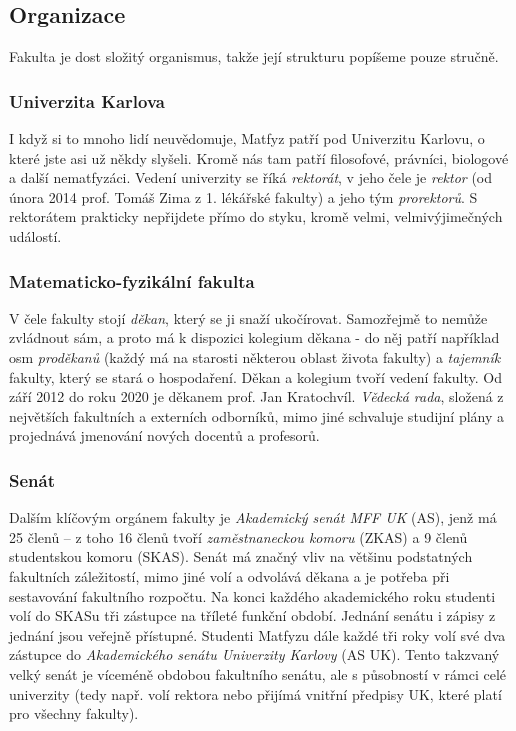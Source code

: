 \subsection{Organizace}
Fakulta je dost složitý organismus, takže její strukturu popíšeme pouze stručně.


\subsubsection{Univerzita Karlova}
I když si to mnoho lidí neuvědomuje, Matfyz patří pod Univerzitu Karlovu, o které
jste asi už někdy slyšeli. Kromě nás tam patří filosofové, právníci, biologové a
další nematfyzáci. Vedení univerzity se říká \textit{rektorát}, v jeho čele je
\textit{rektor} (od února 2014 prof. Tomáš Zima z 1. lékářské fakulty) a jeho
tým \textit{prorektorů}. S rektorátem prakticky nepřijdete přímo do styku, kromě
velmi, velmivýjimečných událostí.


\subsubsection{Matematicko-fyzikální fakulta}
V čele fakulty stojí \textit{děkan}, který se ji snaží ukočírovat. Samozřejmě to
nemůže zvládnout sám, a proto má k dispozici kolegium děkana - do něj patří
například osm \textit{proděkanů} (každý má na starosti některou oblast života
fakulty) a \textit{tajemník} fakulty, který se stará o hospodaření. Děkan a
kolegium tvoří vedení fakulty. Od září 2012 do roku 2020 je děkanem prof. Jan
Kratochvíl. \textit{Vědecká rada}, složená z největších fakultních a externích
odborníků, mimo jiné schvaluje studijní plány a projednává jmenování nových
docentů a profesorů.


\subsubsection{Senát}
Dalším klíčovým orgánem fakulty je \textit{Akademický senát MFF UK} (AS), jenž
má 25 členů – z toho 16 členů tvoří \textit{zaměstnaneckou komoru} (ZKAS) a 9
členů studentskou komoru (SKAS). Senát má značný vliv na většinu podstatných
fakultních záležitostí, mimo jiné volí a odvolává děkana a je potřeba při sestavování fakultního rozpočtu. Na konci každého akademického roku
studenti volí do SKASu tři zástupce na tříleté funkční období. Jednání senátu i
zápisy z jednání jsou veřejně přístupné. Studenti Matfyzu dále každé tři roky
volí své dva zástupce do \textit{Akademického senátu Univerzity Karlovy} (AS
UK). Tento takzvaný velký senát je víceméně obdobou fakultního senátu, ale s
působností v rámci celé univerzity (tedy např. volí rektora nebo přijímá vnitřní
předpisy UK, které platí pro všechny fakulty).


